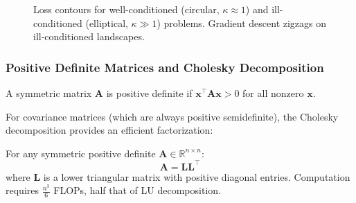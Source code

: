 \begin{figure}[htbp]
    \centering
    \caption[Condition number and loss contours]{Loss contours for well-conditioned (circular, $\kappa \approx 1$) and ill-conditioned (elliptical, $\kappa \gg 1$) problems. Gradient descent zigzags on ill-conditioned landscapes.}
    \label{fig:condition_number}
\end{figure}

\subsubsection{Positive Definite Matrices and Cholesky Decomposition}

\begin{definition}
A symmetric matrix $\mathbf{A}$ is positive definite if $\mathbf{x}^\top \mathbf{A}\mathbf{x} > 0$ for all nonzero $\mathbf{x}$.
\end{definition}

For covariance matrices (which are always positive semidefinite), the Cholesky decomposition provides an efficient factorization:

\begin{theorem}
For any symmetric positive definite $\mathbf{A} \in \mathbb{R}^{n \times n}$:
\begin{equation}
\mathbf{A} = \mathbf{L}\mathbf{L}^\top
\end{equation}
where $\mathbf{L}$ is a lower triangular matrix with positive diagonal entries. Computation requires $\frac{n^3}{6}$ FLOPs, half that of LU decomposition.
\end{theorem}

